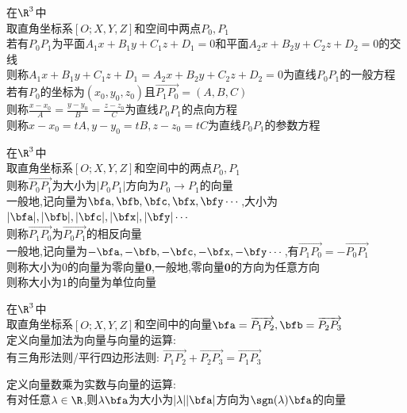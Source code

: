 \begin{dingyi}
在$\R^3$中\\
取直角坐标系$[O;X,Y,Z]$和空间中两点$P_0,P_1$\\
若有$P_0P_1$为平面$A_1x+B_1y+C_1z+D_1=0$和平面$A_2x+B_2y+C_2z+D_2=0$的交线\\
则称$A_1x+B_1y+C_1z+D_1=A_2x+B_2y+C_2z+D_2=0$为直线$P_0P_1$的一般方程\\
若有$P_0$的坐标为$(x_0,y_0,z_0)$且$\overrightarrow{P_1P_0}=(A,B,C)$\\
则称$\frac{x-x_0}{A}=\frac{y-y_0}{B}=\frac{z-z_0}{C}$为直线$P_0P_1$的点向方程\\
则称$x-x_0=tA,y-y_0=tB,z-z_0=tC$为直线$P_0P_1$的参数方程
\end{dingyi}

\begin{dingyi}
在$\R^3$中\\
取直角坐标系$[O;X,Y,Z]$和空间中的两点$P_0,P_1$\\
则称$\overrightarrow{P_0P_1}$为大小为$|P_0P_1|$方向为$P_0\to P_1$的向量\\
一般地,记向量为$\bfa,\bfb,\bfc,\bfx,\bfy\cdots$,大小为$|\bfa|,|\bfb|,|\bfc|,|\bfx|,|\bfy|\cdots$\\
则称$\overrightarrow{P_1P_0}$为$\overrightarrow{P_0P_1}$的相反向量\\
一般地,记向量为$-\bfa,-\bfb,-\bfc,-\bfx,-\bfy\cdots$,有$\overrightarrow{P_1P_0}=-\overrightarrow{P_0P_1}$\\
则称大小为$0$的向量为零向量$\mathbf{0}$,一般地,零向量$\mathbf{0}$的方向为任意方向\\
则称大小为$1$的向量为单位向量
\end{dingyi}

\begin{dingyi}
在$\R^3$中\\
取直角坐标系$[O;X,Y,Z]$和空间中的向量$\bfa=\overrightarrow{P_1P_2},\bfb=\overrightarrow{P_2P_3}$\\
定义向量加法为向量与向量的运算:\\
有三角形法则/平行四边形法则: $\overrightarrow{P_1P_2}+\overrightarrow{P_2P_3}=\overrightarrow{P_1P_3}$
\begin{center}
\end{center}
定义向量数乘为实数与向量的运算:\\
有对任意$\lambda\in\R$,则$\lambda\bfa$为大小为$|\lambda||\bfa|$方向为$\sgn(\lambda)\bfa$的向量
\end{dingyi}

